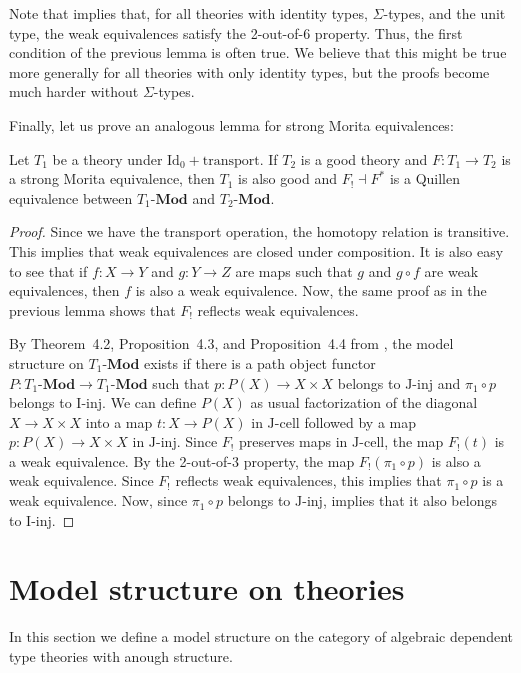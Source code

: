 \documentclass[reqno]{amsart}
\theoremstyle{definition}
\theoremstyle{remark}
\newcommand{\cat}[1]{\mathbf{#1}}
\newcommand{\Mod}[1]{#1\text{-}\cat{Mod}}
\newcommand{\IdT}{\mathrm{Id}}
\newcommand{\transportT}{\mathrm{transport}}
\newcommand{\I}{\mathrm{I}}
\newcommand{\J}{\mathrm{J}}
\newcommand{\class}[2]{#1\text{-}\mathrm{#2}}
\newcommand{\Iinj}[1][\I]{\class{#1}{inj}}
\newcommand{\Icell}[1][\I]{\class{#1}{cell}}
\newcommand{\Jinj}[1][]{\Iinj[\J#1]}
\newcommand{\Jcell}[1][]{\Icell[\J#1]}
\numberwithin{figure}{section}
\begin{document}
Note that \cite[Proposition~3.3]{kap-lum-model} implies that, for all theories with identity types, $\Sigma$-types, and the unit type, the weak equivalences satisfy the 2-out-of-6 property.
Thus, the first condition of the previous lemma is often true.
We believe that this might be true more generally for all theories with only identity types, but the proofs become much harder without $\Sigma$-types.

Finally, let us prove an analogous lemma for strong Morita equivalences:

\begin{lem}
Let $T_1$ be a theory under $\IdT_0 + \transportT$.
If $T_2$ is a good theory and $F : T_1 \to T_2$ is a strong Morita equivalence, then $T_1$ is also good and $F_! \dashv F^*$ is a Quillen equivalence between $\Mod{T_1}$ and $\Mod{T_2}$.
\end{lem}
\begin{proof}
Since we have the transport operation, the homotopy relation is transitive.
This implies that weak equivalences are closed under composition.
It is also easy to see that if $f : X \to Y$ and $g : Y \to Z$ are maps such that $g$ and $g \circ f$ are weak equivalences, then $f$ is also a weak equivalence.
Now, the same proof as in the previous lemma shows that $F_!$ reflects weak equivalences.

By Theorem~4.2, Proposition~4.3, and Proposition~4.4 from \cite{f-model-structures}, the model structure on $\Mod{T_1}$ exists if there is a path object functor $P : \Mod{T_1} \to \Mod{T_1}$
such that $p : P(X) \to X \times X$ belongs to $\Jinj$ and $\pi_1 \circ p$ belongs to $\Iinj$.
We can define $P(X)$ as usual factorization of the diagonal $X \to X \times X$ into a map $t : X \to P(X)$ in $\Jcell$ followed by a map $p : P(X) \to X \times X$ in $\Jinj$.
Since $F_!$ preserves maps in $\Jcell$, the map $F_!(t)$ is a weak equivalence.
By the 2-out-of-3 property, the map $F_!(\pi_1 \circ p)$ is also a weak equivalence.
Since $F_!$ reflects weak equivalences, this implies that $\pi_1 \circ p$ is a weak equivalence.
Now, since $\pi_1 \circ p$ belongs to $\Jinj$, \cite[Proposition~3.1]{f-model-structures} implies that it also belongs to $\Iinj$.
\end{proof}

\section{Model structure on theories}

In this section we define a model structure on the category of algebraic dependent type theories with anough structure.
\end{document}
